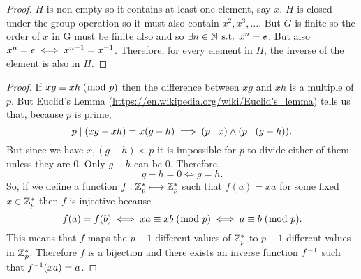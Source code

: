 \documentclass[MathsNotesBase.tex]{subfiles}
\begin{document}
{	
	\begin{proof}
		$H$ is non-empty so it contains at least one element, say ${ x }$. $H$ is closed under the group operation so it must also contain ${ x^2, x^3, \dots }$. But $G$ is finite so the order of $x$ in G must be finite also and so ${ \exists n \in \mathbb{N}^{} \text{ s.t. } x^n = e }$. But also ${ x^n = e \iff x^{n-1} = {x}^{-1} }$. Therefore, for every element in $H$, the inverse of the element is also in $H$.
	\end{proof}

	\begin{proof}
		If ${ xg \equiv xh \;(\bmod\; p) }$ then the difference between $xg$ and $xh$ is a multiple of $p$. But Euclid's Lemma (\url{https://en.wikipedia.org/wiki/Euclid's_lemma}) tells us that, because $p$ is prime, 
		\[ p \mid (xg - xh) = x(g - h) \implies (p \mid x) \wedge (p \mid (g-h)). \]
		But since we have ${ x,(g-h) < p }$ it is impossible for $p$ to divide either of them unless they are 0. Only ${ g-h }$ can be 0. Therefore,
		\[ g - h = 0 \iff g = h. \]
		So, if we define a function ${ f: \mathbb{Z}^{*}_p \longmapsto \mathbb{Z}^{*}_p }$ such that ${ f(a) = xa }$ for some fixed ${ x \in \mathbb{Z}^{*}_p }$ then $f$ is injective because
		\[ f(a) = f(b) \iff xa \equiv xb \;(\bmod\; p) \iff a \equiv b \;(\bmod\; p). \]
		This means that $f$ maps the ${ p-1 }$ different values of ${ \mathbb{Z}^{*}_p }$ to ${ p-1 }$ different values in ${ \mathbb{Z}^{*}_p }$. Therefore $f$ is a bijection and there exists an inverse function ${ {f}^{-1} }$ such that ${ {f}^{-1}(xa) = a }$.
	\end{proof}

	\medskip
}
\end{document}
